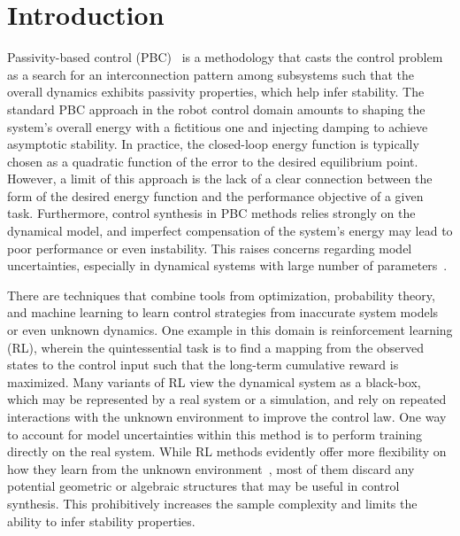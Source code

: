 \section{Introduction}


Passivity-based control (PBC)~\cite{ortega2001putting,van2000l2} is a
methodology that casts the control problem as a search for an interconnection
pattern among subsystems such that the overall dynamics exhibits passivity
properties, which help infer stability.
%
The standard PBC approach in the robot control domain amounts to shaping the
system's overall energy with a fictitious one and injecting damping to
achieve asymptotic stability.
%
In practice, the closed-loop energy function is typically chosen as a quadratic
function of the error to the desired equilibrium point.
%
However, a limit of this approach is the lack of a clear connection between the
form of the desired energy function and the performance objective of a given
task.
%
Furthermore, control synthesis in PBC methods relies strongly on the dynamical
model, and imperfect compensation of the system's energy may lead to poor
performance or even instability.
%
This raises concerns regarding model uncertainties, especially in dynamical
systems with large number of parameters~\cite{nagy,wu2020active}.
%
%


There are techniques that combine tools from optimization, probability theory,
and machine learning to learn control strategies from inaccurate system models
or even unknown dynamics.
%
%
%
One example in this domain is reinforcement learning (RL), wherein the quintessential
task is to find a mapping from the observed states to the control input such
that the long-term cumulative reward is maximized.
%
Many variants of RL view the dynamical system as a black-box, which may be
represented by a real system or a simulation, and rely on repeated interactions
with the unknown environment to improve the control law.
%
One way to account for model uncertainties within this method is to perform training
directly on the real system.
%
%
While RL methods evidently offer more flexibility on how they learn from the
unknown environment~\cite{heess2017emergence, andrychowicz2020learning,
lillicrap2015continuous}, most of them discard any potential geometric or
algebraic structures that may be useful in control synthesis.
%
This prohibitively increases the sample complexity and limits the ability to
infer stability properties.


